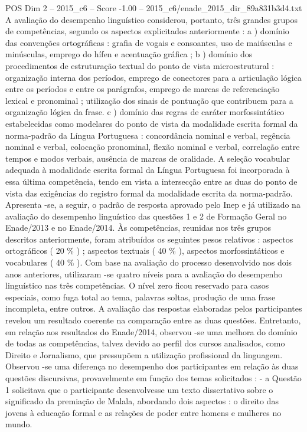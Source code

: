 \begin{textsample}{POS Dim 2 – 2015\_c6 – Score -1.00 – 2015\_c6/enade\_2015\_dir\_89a831b3d4.txt}
A avaliação do desempenho linguístico considerou, portanto, três grandes grupos de competências, segundo os aspectos explicitados anteriormente : a ) domínio das convenções ortográficas : grafia de vogais e consoantes, uso de maiúsculas e minúsculas, emprego do hífen e acentuação gráfica ; b ) domínio dos procedimentos de estruturação textual do ponto de vista microestrutural : organização interna dos períodos, emprego de conectores para a articulação lógica entre os períodos e entre os parágrafos, emprego de marcas de referenciação lexical e pronominal ; utilização dos sinais de pontuação que contribuem para a organização lógica da frase. c ) domínio das regras de caráter morfossintático estabelecidas como modelares do ponto de vista da modalidade escrita formal da norma-padrão da Língua Portuguesa : concordância nominal e verbal, regência nominal e verbal, colocação pronominal, flexão nominal e verbal, correlação entre tempos e modos verbais, ausência de marcas de oralidade.
A seleção vocabular adequada à modalidade escrita formal da Língua Portuguesa foi incorporada à essa última competência, tendo em vista a intersecção entre as duas do ponto de vista das exigências do registro formal da modalidade escrita da norma-padrão.
Apresenta -se, a seguir, o padrão de resposta aprovado pelo Inep e já utilizado na avaliação do desempenho linguístico das questões 1 e 2 de Formação Geral no Enade/2013 e no Enade/2014.
Às competências, reunidas nos três grupos descritos anteriormente, foram atribuídos os seguintes pesos relativos : aspectos ortográficos ( 20 \% ) ; aspectos textuais ( 40 \% ), aspectos morfossintáticos e vocabulares ( 40 \% ).
Com base na avaliação do processo desenvolvido nos dois anos anteriores, utilizaram -se quatro níveis para a avaliação do desempenho linguístico nas três competências.
O nível zero ficou reservado para casos especiais, como fuga total ao tema, palavras soltas, produção de uma frase incompleta, entre outros.
A avaliação das respostas elaboradas pelos participantes revelou um resultado coerente na comparação entre as duas questões.
Entretanto, em relação aos resultados do Enade/2014, observou -se uma melhora do domínio de todas as competências, talvez devido ao perfil dos cursos analisados, como Direito e Jornalismo, que pressupõem a utilização profissional da linguagem.
Observou -se uma diferença no desempenho dos participantes em relação às duas questões discursivas, provavelmente em função dos temas solicitados : - a Questão 1 solicitava que o participante desenvolvesse um texto dissertativo sobre o significado da premiação de Malala, abordando dois aspectos : o direito das jovens à educação formal e as relações de poder entre homens e mulheres no mundo.

\end{textsample}
